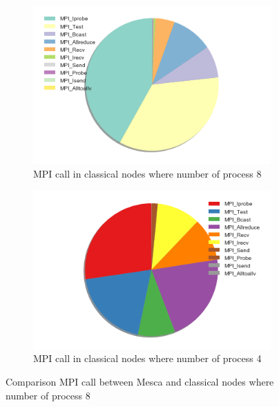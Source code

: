 \begin{figure}[!h]
\centering 
  \begin{subfigure}[b]{0.7\textwidth}
    \includegraphics[width=\textwidth]{images/PieInca8process.png}
    \caption{MPI call in classical nodes where number of process 8}
    \label{MPIProfInca}
  \end{subfigure}
  \begin{subfigure}[b]{0.7\textwidth}
    \includegraphics[width=\textwidth]{images/PieMesca4process.png}
    \caption{MPI call in classical nodes where number of process 4}
    \label{MPIProfMesc}
  \end{subfigure}
  \caption{Comparison MPI call between Mesca and classical nodes where number of process 8}
\end{figure}